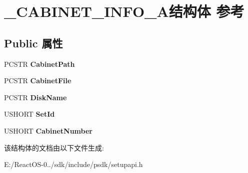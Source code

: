 \hypertarget{struct___c_a_b_i_n_e_t___i_n_f_o___a}{}\section{\+\_\+\+C\+A\+B\+I\+N\+E\+T\+\_\+\+I\+N\+F\+O\+\_\+\+A结构体 参考}
\label{struct___c_a_b_i_n_e_t___i_n_f_o___a}
\subsection*{Public 属性}
\begin{DoxyCompactItemize}
\item 
\mbox{\label{struct___c_a_b_i_n_e_t___i_n_f_o___a_abe5c418089a4559d39d823b05bc7c803}} 
P\+C\+S\+TR {\bfseries Cabinet\+Path}
\item 
\mbox{\label{struct___c_a_b_i_n_e_t___i_n_f_o___a_a45329a592383239ec367b83ecacd1d28}} 
P\+C\+S\+TR {\bfseries Cabinet\+File}
\item 
\mbox{\label{struct___c_a_b_i_n_e_t___i_n_f_o___a_aee045ab78a3341216471aceb8535c2ce}} 
P\+C\+S\+TR {\bfseries Disk\+Name}
\item 
\mbox{\label{struct___c_a_b_i_n_e_t___i_n_f_o___a_ada74ef27d88e4f05a1ffc34ea0b7ff1c}} 
U\+S\+H\+O\+RT {\bfseries Set\+Id}
\item 
\mbox{\label{struct___c_a_b_i_n_e_t___i_n_f_o___a_aa134f059bca29a50d3635a0d806b1be8}} 
U\+S\+H\+O\+RT {\bfseries Cabinet\+Number}
\end{DoxyCompactItemize}


该结构体的文档由以下文件生成\+:\begin{DoxyCompactItemize}
\item 
E\+:/\+React\+O\+S-\/0../sdk/include/psdk/setupapi.\+h\end{DoxyCompactItemize}
